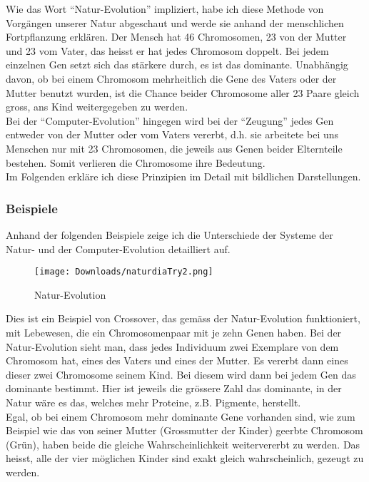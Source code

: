 \documentclass[11pt,a4paper,ngerman]{article}
\begin{document}
Wie das Wort \enquote{Natur-Evolution} impliziert, habe ich diese Methode von Vorgängen unserer Natur abgeschaut und werde sie anhand der menschlichen Fortpflanzung erklären. Der Mensch hat 46 Chromosomen, 23 von der Mutter und 23 vom Vater, das heisst er hat jedes Chromosom doppelt. Bei jedem einzelnen Gen setzt sich das stärkere durch, es ist das dominante. Unabhängig davon, ob bei einem Chromosom mehrheitlich die Gene des Vaters oder der Mutter benutzt wurden, ist die Chance beider Chromosome aller 23 Paare gleich gross, ans Kind weitergegeben zu werden.\\

Bei der \enquote{Computer-Evolution} hingegen wird bei der \enquote{Zeugung} jedes Gen entweder von der Mutter oder vom Vaters vererbt, d.h. sie arbeitete bei uns Menschen nur mit 23 Chromosomen, die jeweils aus Genen beider Elternteile bestehen. Somit verlieren die Chromosome ihre Bedeutung.\\

Im Folgenden erkläre ich diese Prinzipien im Detail mit bildlichen Darstellungen.

\subsubsection{Beispiele}

Anhand der folgenden Beispiele zeige ich die Unterschiede der Systeme der Natur- und der Computer-Evolution detailliert auf.\\
\begin{figure}[H]
    \begin{center}
        \texttt{[image: Downloads/naturdiaTry2.png]}
        \caption{Natur-Evolution} \label{fig:natur}
    \end{center}
\end{figure}

Dies ist ein Beispiel von Crossover, das gemäss der Natur-Evolution funktioniert, mit Lebewesen, die ein Chromosomenpaar mit je zehn Genen haben. Bei der Natur-Evolution sieht man, dass jedes Individuum zwei Exemplare von dem Chromosom hat, eines des Vaters und eines der Mutter. Es vererbt dann eines dieser zwei Chromosome seinem Kind. Bei diesem wird dann bei jedem Gen das dominante bestimmt. Hier ist jeweils die grössere Zahl das dominante, in der Natur wäre es das, welches mehr Proteine, z.B. Pigmente, herstellt.\\

Egal, ob bei einem Chromosom mehr dominante Gene vorhanden sind, wie zum Beispiel wie das von seiner Mutter (Grossmutter der Kinder) geerbte Chromosom (Grün), haben beide die gleiche Wahrscheinlichkeit weitervererbt zu werden. Das heisst, alle der vier möglichen Kinder sind exakt gleich wahrscheinlich, gezeugt zu werden.\\
\end{document}

